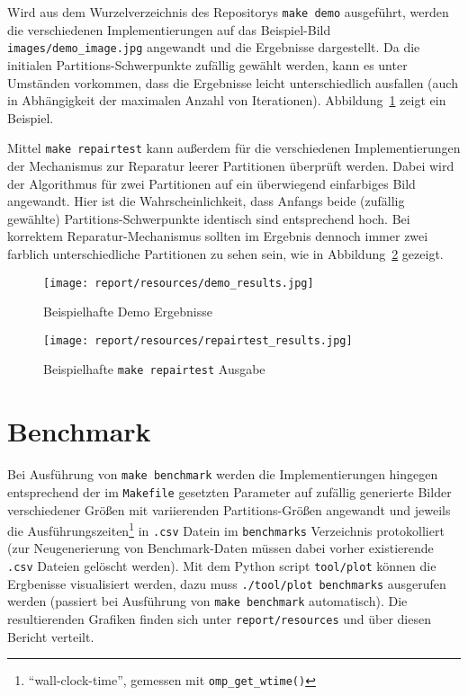 \documentclass[
    bibliography=totoc, cd=lightcolor, cdmath=false, ngerman]{tudscrreprt}
\begin{document}
Wird aus dem Wurzelverzeichnis des Repositorys \texttt{make demo} ausgeführt,
werden die verschiedenen Implementierungen auf das Beispiel-Bild
\texttt{images/demo\_image.jpg} angewandt und die Ergebnisse dargestellt. Da
die initialen Partitions-Schwerpunkte zufällig gewählt werden, kann es unter
Umständen vorkommen, dass die Ergebnisse leicht unterschiedlich ausfallen
(auch in Abhängigkeit der maximalen Anzahl von Iterationen).
Abbildung~\ref{img:demoresults} zeigt ein Beispiel.

Mittel \texttt{make repairtest} kann außerdem für die verschiedenen
Implementierungen der Mechanismus zur Reparatur leerer Partitionen überprüft
werden. Dabei wird der Algorithmus für zwei Partitionen auf ein überwiegend
einfarbiges Bild angewandt. Hier ist die Wahrscheinlichkeit, dass Anfangs beide
(zufällig gewählte) Partitions-Schwerpunkte identisch sind entsprechend hoch.
Bei korrektem Reparatur-Mechanismus sollten im Ergebnis dennoch immer zwei
farblich unterschiedliche Partitionen zu sehen sein, wie in
Abbildung~\ref{img:repairtest} gezeigt.

\begin{figure}[htbp]
  \centering
    \texttt{[image: report/resources/demo\_results.jpg]}
  \caption{Beispielhafte Demo Ergebnisse}
  \label{img:demoresults}
\end{figure}

\begin{figure}[htbp]
  \centering
    \texttt{[image: report/resources/repairtest\_results.jpg]}
  \caption{Beispielhafte \texttt{make repairtest} Ausgabe}
  \label{img:repairtest}
\end{figure}

\section{Benchmark}

Bei Ausführung von \texttt{make benchmark} werden die Implementierungen
hingegen entsprechend der im \texttt{Makefile} gesetzten Parameter auf zufällig
generierte Bilder verschiedener Größen mit variierenden Partitions-Größen
angewandt und jeweils die Ausführungszeiten\footnote{``wall-clock-time'',
gemessen mit \texttt{omp\_get\_wtime()}} in \texttt{.csv} Datein im
\texttt{benchmarks} Verzeichnis protokolliert (zur Neugenerierung von
Benchmark-Daten müssen dabei vorher existierende \texttt{.csv} Dateien gelöscht
werden). Mit dem Python script \texttt{tool/plot} können die Ergbenisse
visualisiert werden, dazu muss \texttt{./tool/plot benchmarks} ausgerufen
werden (passiert bei Ausführung von \texttt{make benchmark} automatisch). Die
resultierenden Grafiken finden sich unter \texttt{report/resources} und über
diesen Bericht verteilt.
\end{document}
